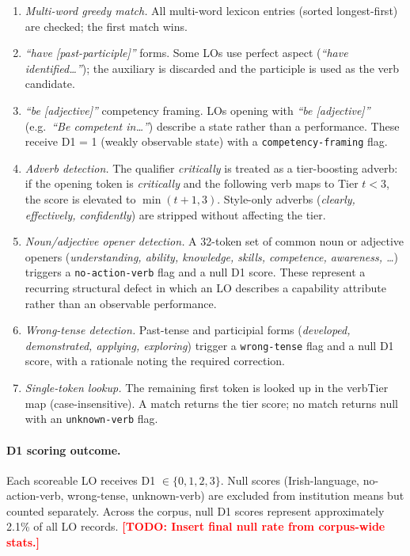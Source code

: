 \documentclass[12pt, a4paper]{article}
\newcommand{\todo}[1]{\textcolor{red}{\textbf{[TODO: #1]}}}
\begin{document}
\begin{enumerate}
  \item \textit{Multi-word greedy match.} All multi-word lexicon entries (sorted longest-first)
    are checked; the first match wins.
  \item \textit{``have [past-participle]''} forms. Some LOs use perfect aspect
    (\textit{``have identified\ldots''}); the auxiliary is discarded and the participle
    is used as the verb candidate.
  \item \textit{``be [adjective]''} competency framing. LOs opening with
    \textit{``be [adjective]''} (e.g.\ \textit{``Be competent in\ldots''}) describe
    a state rather than a performance. These receive D1 = 1 (weakly observable state)
    with a \texttt{competency-framing} flag.
  \item \textit{Adverb detection.} The qualifier \textit{critically} is treated as a
    tier-boosting adverb: if the opening token is \textit{critically} and the
    following verb maps to Tier $t < 3$, the score is elevated to $\min(t+1, 3)$.
    Style-only adverbs (\textit{clearly, effectively, confidently}) are stripped
    without affecting the tier.
  \item \textit{Noun/adjective opener detection.} A 32-token set of common noun or
    adjective openers (\textit{understanding, ability, knowledge, skills, competence,
    awareness, \ldots}) triggers a \texttt{no-action-verb} flag and a null D1 score.
    These represent a recurring structural defect in which an LO describes a capability
    attribute rather than an observable performance.
  \item \textit{Wrong-tense detection.} Past-tense and participial forms
    (\textit{developed, demonstrated, applying, exploring}) trigger a
    \texttt{wrong-tense} flag and a null D1 score, with a rationale noting the
    required correction.
  \item \textit{Single-token lookup.} The remaining first token is looked up in the
    verbTier map (case-insensitive). A match returns the tier score; no match returns
    null with an \texttt{unknown-verb} flag.
\end{enumerate}

\paragraph{D1 scoring outcome.}
Each scoreable LO receives D1 $\in \{0, 1, 2, 3\}$. Null scores (Irish-language,
no-action-verb, wrong-tense, unknown-verb) are excluded from institution means
but counted separately. Across the corpus, null D1 scores represent approximately
2.1\% of all LO records.
\todo{Insert final null rate from corpus-wide stats.}
\end{document}
